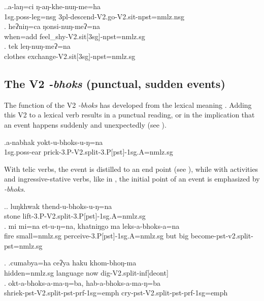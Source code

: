 \ex.\ag.a-laŋ=ci ŋ-aŋ-khe-nuŋ-me=ha\\
{\sc 1sg.poss-}leg{\sc =nsg} {\sc 3pl-}descend{\sc -V2.go-V2.sit-npst=nmlz.nsg}\\
\bg. heʔniŋ=ca ŋonsi-nuŋ-meʔ=na\\
when{\sc =add} feel\_shy{\sc -V2.sit[3sg]-npst=nmlz.sg}\\
\bg. tek leŋ-nuŋ-meʔ=na\\
clothes exchange{\sc -V2.sit[3sg]-npst=nmlz.sg}\\



\subsection{The V2 \emph{-bhoks}  (punctual, sudden events)}\label{V2-split}%

The function of the V2  \emph{-bhoks}  has developed from the lexical meaning . Adding this V2 to a lexical verb results in a punctual reading, or in the implication that an event happens suddenly and unexpectedly (see \Next). 

\exg.a-nabhak yokt-u-bhoks-u-ŋ=na\\
{\sc 1sg.poss-}ear prick{\sc -3.P-V2.split-3.P[pst]-1sg.A=nmlz.sg}\\


With telic verbs, the event is distilled to an end point (see \Next), while with activities and ingressive-stative verbs, like in \NNext, the initial point of an event is emphasized by \emph{-bhoks}.

	\ex.\ag. luŋkhwak thend-u-bhoks-u-ŋ=na\\
		stone lift{\sc -3.P-V2.split-3.P[pst]-1sg.A=nmlz.sg}\\
	\bg. mi mi=na et-u-ŋ=na, khatniŋgo ma leks-a-bhoks-a=na\\
	fire small{\sc =nmlz.sg} perceive{\sc -3.P[pst]-1sg.A=nmlz.sg} but big become{\sc [3sg]-pst-v2.split-pst=nmlz.sg}	\\
	
	
\ex. \ag.cumabya=ha ceʔya haku khom-bhoŋ-ma\\
hidden{\sc =nmlz.sg} language now dig{\sc -V2.split-inf[deont]}\\
\bg. okt-a-bhoks-a-ma-ŋ=ba, hab-a-bhoks-a-ma-ŋ=ba\\
	shriek{\sc -pst-V2.split-pst-prf-1sg=emph} cry{\sc -pst-V2.split-pst-prf-1sg=emph}\\
	 
	 
